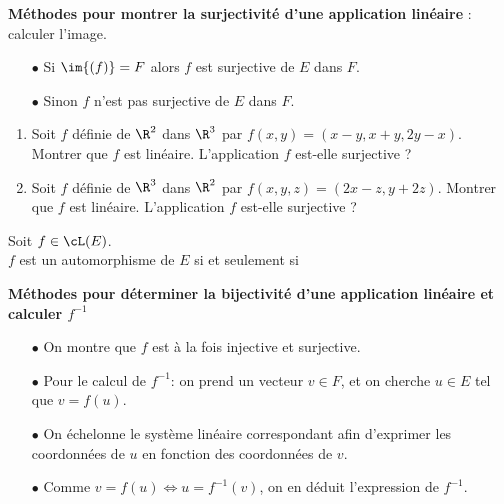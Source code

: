 \documentclass[a4paper, 11pt]{article}
\begin{document}
\begin{dboxminipage}{0.9 \textwidth}
\textbf{M\'ethodes pour montrer la surjectivit\'e d'une application lin\'eaire} : calculer l'image.
\begin{itemize}
\item[$\bullet$] Si $\im{(f)}=F$ alors $f$ est surjective de $E$ dans $F$.
\item[$\bullet$] Sinon $f$ n'est pas surjective de $E$ dans $F$.
\end{itemize}
\end{dboxminipage}




{\footnotesize \begin{exercice} 
\begin{enumerate}
\item Soit $f$ d\'efinie de $\R^2$ dans $\R^3$ par $f(x,y)=(x-y, x+y, 2y-x)$. Montrer que $f$ est lin\'eaire. L'application $f$ est-elle surjective ? 
\item Soit $f$ d\'efinie de $\R^3$ dans $\R^2$ par $f(x,y,z)=(2x-z,y+2z)$. Montrer que $f$ est lin\'eaire. L'application $f$ est-elle surjective ?
\end{enumerate}
\end{exercice}
}


\vspace{0.4cm}


\begin{prop}
Soit $f\in\cL(E)$.\vsec\\
\noindent $f$ est un automorphisme de $E$ si et seulement si \dotfill \vsec
\end{prop}

\begin{dboxminipage}{0.93\textwidth}
\textbf{M\'ethodes pour d\'eterminer la bijectivit\'e d'une application lin\'eaire et calculer $f^{-1}$}
\begin{itemize}
\item[$\bullet$] On montre que $f$ est \`a la fois injective et surjective.
\item[$\bullet$] Pour le calcul de $f^{-1}$: on prend un vecteur $v\in F$, et on cherche $u\in E$ tel que $v=f(u)$.
\item[$\bullet$] On \'echelonne le syst\`eme lin\'eaire correspondant afin d'exprimer les coordonn\'ees de $u$ en fonction des coordonn\'ees de $v$.
\item[$\bullet$] Comme $v=f(u) \Leftrightarrow u=f^{-1}(v)$, on en d\'eduit l'expression de $f^{-1}$.
\end{itemize}
\end{dboxminipage}
\end{document}
